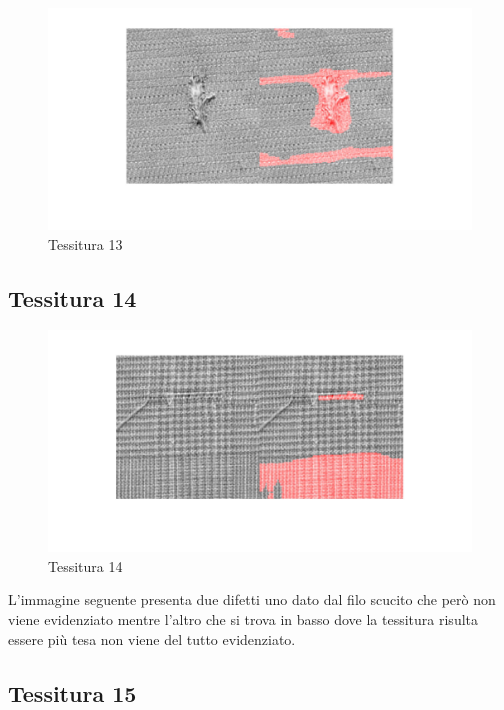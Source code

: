 \documentclass{article}
\begin{document}
\begin{figure}[h!]
	\centering
	\includegraphics[width=\textwidth]{results/res13.jpg}
	\caption{Tessitura 13}
\end{figure}

\newpage

\subsection{Tessitura 14}

\begin{figure}[h!]
	\centering
	\includegraphics[width=\textwidth]{results/res14.jpg}
	\caption{Tessitura 14}
\end{figure}

L'immagine seguente presenta due difetti uno dato dal filo scucito che però non viene evidenziato mentre l'altro che si trova in basso dove la tessitura risulta essere più tesa non viene del tutto evidenziato.

\newpage

\subsection{Tessitura 15}
\end{document}
